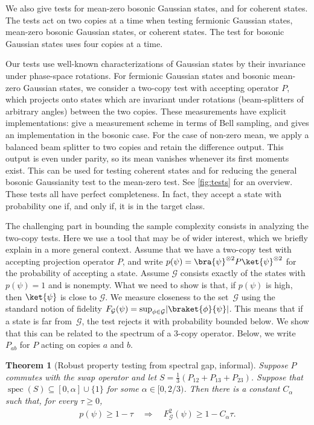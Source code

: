 \documentclass[11pt,a4paper]{article}
\newtheorem{theorem}{Theorem}[section]
\numberwithin{equation}{section}
\newcommand{\ot}{\otimes}
\newcommand{\GG}{\mathcal G}
\newcommand{\1}{\mathbf{1}}
\DeclareMathOperator{\spec}{spec}
\DeclarePairedDelimiter\abs{\lvert}{\rvert}
\begin{document}
We also give tests for mean-zero bosonic Gaussian states, and for coherent states.
The tests act on two copies at a time when testing fermionic Gaussian states, mean-zero bosonic Gaussian states, or coherent states.
The test for bosonic Gaussian states uses four copies at a time.

Our tests use well-known characterizations of Gaussian states by their invariance under phase-space rotations.
For fermionic Gaussian states and bosonic mean-zero Gaussian states, we consider a two-copy test with accepting operator $P$, which projects onto states which are invariant under rotations (beam-splitters of arbitrary angles) between the two copies.
These measurements have explicit implementations: \cite{haug2026practical,tarabunga2026fermionic} give a measurement scheme in terms of Bell sampling, and \cite{hertz2019multicopy} gives an implementation in the bosonic case.
For the case of non-zero mean, we apply a balanced beam splitter to two copies and retain the difference output. This output is even under parity, so its mean vanishes whenever its first moments exist. This can be used for testing coherent states and for reducing the general bosonic Gaussianity test to the mean-zero test. See \cref{fig:tests} for an overview.
These tests all have perfect completeness.
In fact, they accept a state with probability one if, and only if, it is in the target class.

The challenging part in bounding the sample complexity consists in analyzing the two-copy tests.
Here we use a tool that may be of wider interest, which we briefly explain in a more general context.
Assume that we have a two-copy test with accepting projection operator $P$, and write $p(\psi) = \bra{\psi}^{\ot 2} P \ket{\psi}^{\ot 2}$ for the probability of accepting a state.
Assume $\GG$ consists exactly of the states with $p(\psi) = 1$ and is nonempty.
What we need to show is that, if $p(\psi)$ is high, then $\ket{\psi}$ is close to $\GG$.
We measure closeness to the set~$\GG$ using the standard notion of fidelity $F_\mathcal G(\psi) = \sup_{\phi\in \mathcal G} \abs{\braket{\phi}{\psi}}$.
This means that if a state is far from~$\GG$, the test rejects it with probability bounded below.
We show that this can be related to the spectrum of a 3-copy operator.
Below, we write $P_{ab}$ for $P$ acting on copies $a$ and $b$.


\begin{theorem}[Robust property testing from spectral gap, informal]\label{thm:gradient-flow-intro}
Suppose $P$ commutes with the swap operator and let $S = \frac13\left(P_{12} + P_{13} + P_{23}\right)$.
Suppose that $\spec(S) \subseteq [0,\alpha] \cup \{1\}$ for some $\alpha\in[0,2/3)$. Then there is a constant $C_\alpha$ such that, for every $\tau\geq0$,
\begin{align*}
    p(\psi) \geq 1 - \tau \quad\Rightarrow\quad F_\GG^2(\psi) \geq 1 - C_\alpha \tau.
\end{align*}
\end{theorem}
\end{document}
